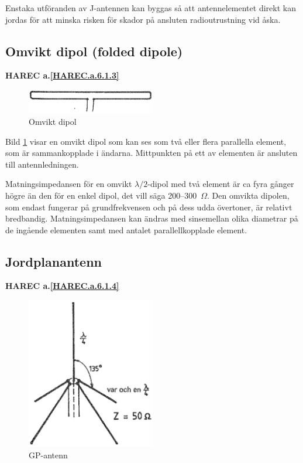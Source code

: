 Enstaka utföranden av J-antennen kan byggas så att antennelementet direkt kan
jordas för att minska risken för skador på ansluten radioutrustning vid åska.

\subsection{Omvikt dipol (folded dipole)}
\textbf{
HAREC a.\ref{HAREC.a.6.1.3}\label{myHAREC.a.6.1.3}
}

\begin{figure}
  \includegraphics[width=0.5\textwidth]{images/cropped_pdfs/bild_2_6-12.pdf}
  \caption{Omvikt dipol}
  \label{fig:bildII6-12}
\end{figure}

Bild \ref{fig:bildII6-12} visar en omvikt dipol som kan ses som två eller flera
parallella element, som är sammankopplade i ändarna.
Mittpunkten på ett av elementen är ansluten till antennledningen.

Matningsimpedansen för en omvikt \(\lambda/2\)-dipol med två element är
ca fyra gånger högre än den för en enkel dipol, det vill säga
200--300~\(\Omega\).
Den omvikta dipolen, som endast fungerar på grundfrekvensen och på
dess udda övertoner, är relativt bredbandig.
Matningsimpedansen kan ändras med sinsemellan olika diametrar på de ingående
elementen samt med antalet parallellkopplade element.

\subsection{Jordplanantenn}
\textbf{
HAREC a.\ref{HAREC.a.6.1.4}\label{myHAREC.a.6.1.4}
}

\begin{figure}
  \includegraphics[width=0.5\textwidth]{images/cropped_pdfs/bild_2_6-13.pdf}
  \caption{GP-antenn}
  \label{fig:bildII6-13}
\end{figure}

